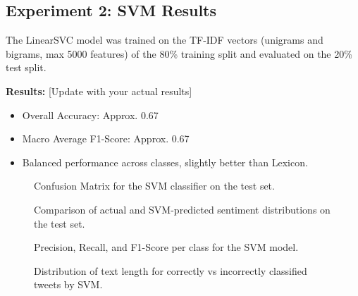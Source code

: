 \documentclass[10pt,twocolumn]{article}
\begin{document}
\subsection{Experiment 2: SVM Results}
\label{subsec:exp_svm}

The LinearSVC model was trained on the TF-IDF vectors (unigrams and bigrams, max 5000 features) of the 80\% training split and evaluated on the 20\% test split.

\textbf{Results:} [Update with your actual results]
\begin{itemize}[itemsep=0pt, topsep=3pt]
    \item Overall Accuracy: Approx. 0.67
    \item Macro Average F1-Score: Approx. 0.67
    \item Balanced performance across classes, slightly better than Lexicon.
\end{itemize}

\begin{figure}[H]
    \centering
    \caption{Confusion Matrix for the SVM classifier on the test set.}
    \label{fig:svm_cm}
\end{figure}

\begin{figure}[H]
    \centering
    \caption{Comparison of actual and SVM-predicted sentiment distributions on the test set.}
    \label{fig:svm_dist_comp}
\end{figure}

\begin{figure}[H]
    \centering
   \caption{Precision, Recall, and F1-Score per class for the SVM model.}
    \label{fig:svm_prf1}
\end{figure}

\begin{figure}[H]
    \centering
    \caption{Distribution of text length for correctly vs incorrectly classified tweets by SVM.}
    \label{fig:svm_len_correct}
\end{figure}
\end{document}
